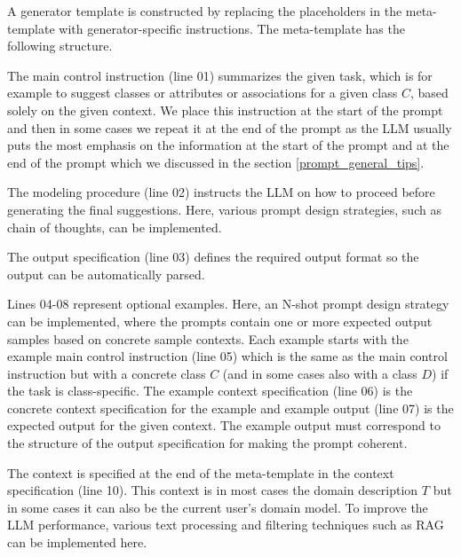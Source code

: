A generator template is constructed by replacing the placeholders in the meta-template with generator-specific instructions. The meta-template has the following structure.

The main control instruction (line 01) summarizes the given task, which is for example to suggest classes or attributes or associations for a given class $C$, based solely on the given context. We place this instruction at the start of the prompt and then in some cases we repeat it at the end of the prompt as the LLM usually puts the most emphasis on the information at the start of the prompt and at the end of the prompt which we discussed in the section \ref{prompt_general_tips}.

The modeling procedure (line 02) instructs the LLM on how to proceed before generating the final suggestions. Here, various prompt design strategies, such as chain of thoughts, can be implemented.

The output specification (line 03) defines the required output format so the output can be automatically parsed.

Lines 04-08 represent optional examples. Here, an N-shot prompt design strategy can be implemented, where the prompts contain one or more expected output samples based on concrete sample contexts. Each example starts with the example main control instruction (line 05) which is the same as the main control instruction but with a concrete class $C$ (and in some cases also with a class $D$) if the task is class-specific. The example context specification (line 06) is the concrete context specification for the example and example output (line 07) is the expected output for the given context. The example output must correspond to the structure of the output specification for making the prompt coherent.

The context is specified at the end of the meta-template in the context specification (line 10). This context is in most cases the domain description $T$ but in some cases it can also be the current user's domain model. To improve the LLM performance, various text processing and filtering techniques such as RAG can be implemented here.